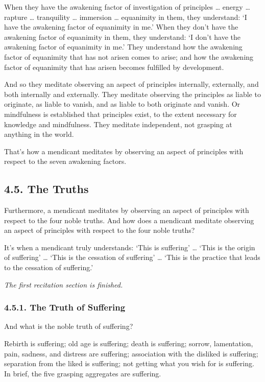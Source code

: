 \documentclass[12pt,openany]{book}%
\newcommand*{\scendsection}[1]{\begin{center}\textit{#1}\end{center}}
\begin{document}
When they have the awakening factor of investigation of principles … energy … rapture … tranquility … immersion … equanimity in them, they understand: ‘I have the awakening factor of equanimity in me.’ When they don’t have the awakening factor of equanimity in them, they understand: ‘I don’t have the awakening factor of equanimity in me.’ They understand how the awakening factor of equanimity that has not arisen comes to arise; and how the awakening factor of equanimity that has arisen becomes fulfilled by development. 

And so they meditate observing an aspect of principles internally, externally, and both internally and externally. They meditate observing the principles as liable to originate, as liable to vanish, and as liable to both originate and vanish. Or mindfulness is established that principles exist, to the extent necessary for knowledge and mindfulness. They meditate independent, not grasping at anything in the world. 

That’s how a mendicant meditates by observing an aspect of principles with respect to the seven awakening factors. 

\subsection*{4.5. The Truths }

Furthermore, a mendicant meditates by observing an aspect of principles with respect to the four noble truths. And how does a mendicant meditate observing an aspect of principles with respect to the four noble truths? 

It’s when a mendicant truly understands: ‘This is suffering’ … ‘This is the origin of suffering’ … ‘This is the cessation of suffering’ … ‘This is the practice that leads to the cessation of suffering.’ 

\scendsection{The first recitation section is finished. }

\subsubsection*{4.5.1. The Truth of Suffering }

And what is the noble truth of suffering? 

Rebirth is suffering; old age is suffering; death is suffering; sorrow, lamentation, pain, sadness, and distress are suffering; association with the disliked is suffering; separation from the liked is suffering; not getting what you wish for is suffering. In brief, the five grasping aggregates are suffering. 
\end{document}
